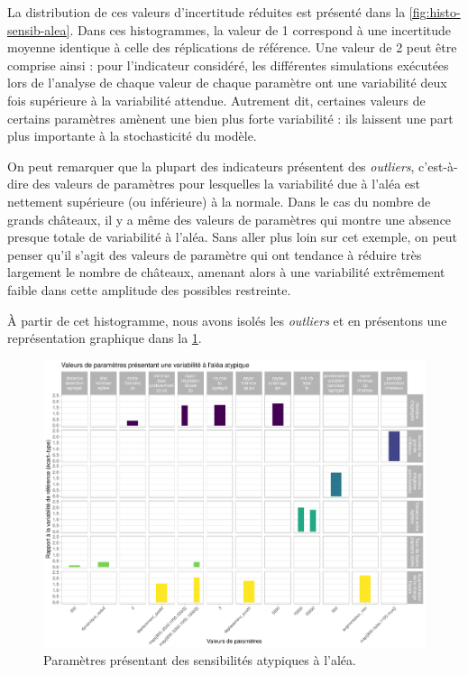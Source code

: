 La distribution de ces valeurs d'incertitude réduites est présenté dans la \cref{fig:histo-sensib-alea}.
Dans ces histogrammes, la valeur de 1 correspond à une incertitude moyenne identique à celle des réplications de référence.
Une valeur de 2 peut être comprise ainsi : pour l'indicateur considéré, les différentes simulations exécutées lors de l'analyse de chaque valeur de chaque paramètre ont une variabilité deux fois supérieure à la variabilité attendue.
Autrement dit, certaines valeurs de certains paramètres amènent une bien plus forte variabilité : ils laissent une part plus importante à la stochasticité du modèle.

On peut remarquer que la plupart des indicateurs présentent des \textit{outliers}, c'est-à-dire des valeurs de paramètres pour lesquelles la variabilité due à l'aléa est nettement supérieure (ou inférieure) à la normale.
Dans le cas du nombre de grands châteaux, il y a même des valeurs de paramètres qui montre une absence presque totale de variabilité à l'aléa.
Sans aller plus loin sur cet exemple, on peut penser qu'il s'agit des valeurs de paramètre qui ont tendance à réduire très largement le nombre de châteaux, amenant alors à une variabilité extrêmement faible dans cette amplitude des possibles restreinte.

À partir de cet histogramme, nous avons isolés les \textit{outliers} et en présentons une représentation graphique dans la \cref{fig:sensib-alea}.
\begin{figure}[H]
	\centering
	\includegraphics[width=\linewidth]{img/sensiblite_alea_outliers.pdf}
	\caption{Paramètres présentant des sensibilités atypiques à l'aléa.}
	\label{fig:sensib-alea}
\end{figure}

